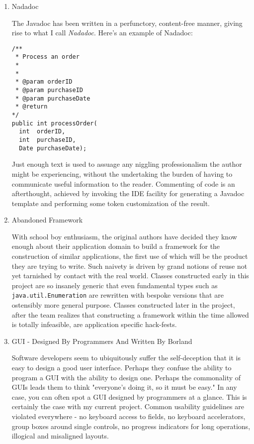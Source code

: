 \documentclass{article}
\begin{document}
\begin{enumerate}
\item Nadadoc
\label{sec:orgheadline338}

The Javadoc has been written in a perfunctory, content-free manner,
giving rise to what I call \emph{Nadadoc}. Here's an example of Nadadoc:

\begin{verbatim}
/**
 * Process an order
 *
 *
 * @param orderID
 * @param purchaseID
 * @param purchaseDate
 * @return
*/
public int processOrder(
  int  orderID, 
  int  purchaseID, 
  Date purchaseDate);
\end{verbatim}

Just enough text is used to assuage any niggling professionalism the
author might be experiencing, without the undertaking the burden of
having to communicate useful information to the reader. Commenting of
code is an afterthought, achieved by invoking the IDE facility for
generating a Javadoc template and performing some token customization of
the result.

\item Abandoned Framework
\label{sec:orgheadline339}

With school boy enthusiasm, the original authors have decided they know
enough about their application domain to build a framework for the
construction of similar applications, the first use of which will be the
product they are trying to write. Such naivety is driven by grand
notions of reuse not yet tarnished by contact with the real world.
Classes constructed early in this project are so insanely generic that
even fundamental types such as \texttt{java.util.Enumeration} are rewritten
with bespoke versions that are ostensibly more general purpose. Classes
constructed later in the project, after the team realizes that
constructing a framework within the time allowed is totally infeasible,
are application specific hack-fests.

\item GUI - Designed By Programmers And Written By Borland
\label{sec:orgheadline340}

Software developers seem to ubiquitously suffer the self-deception that
it is easy to design a good user interface. Perhaps they confuse the
ability to program a GUI with the ability to design one. Perhaps the
commonality of GUIs leads them to think "everyone's doing it, so it must
be easy." In any case, you can often spot a GUI designed by programmers
at a glance. This is certainly the case with my current project. Common
usability guidelines are violated everywhere - no keyboard access to
fields, no keyboard accelerators, group boxes around single controls, no
progress indicators for long operations, illogical and misaligned
layouts.


\end{enumerate}
\end{document}
